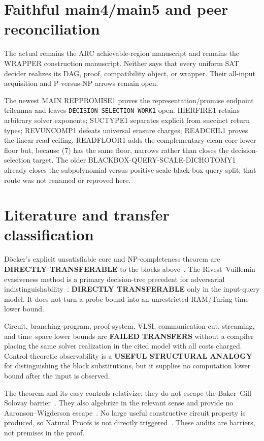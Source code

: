 \documentclass[11pt]{article}
\begin{document}
\section{Faithful main4/main5 and peer reconciliation}
The actual  remains the ARC achievable-region manuscript and
 remains the WRAPPER construction manuscript.  Neither says
that every uniform SAT decider realizes its DAG, proof, compatibility object,
or wrapper.  Their all-input acquisition and P-versus-NP arrows remain open.

The newest MAIN REPPROMISE1 proves the representation/promise endpoint
trilemma and leaves \texttt{DECISION-SELECTION-WORK1} open.  HIERFIRE1 retains
arbitrary solver exponents; SUCTYPE1 separates explicit from succinct return
types; REVUNCOMP1 defeats universal erasure charges; READCEIL1 proves the
linear read ceiling.  READFLOOR1 adds the complementary clean-core lower floor
but, because (7) has the same floor, narrows rather than closes the decision-
selection target.  The older BLACKBOX-QUERY-SCALE-DICHOTOMY1 already closes
the subpolynomial versus positive-scale black-box query split; that route was
not renamed or reproved here.

\section{Literature and transfer classification}
Döcker's explicit unsatisfiable core and NP-completeness theorem are
\textbf{DIRECTLY TRANSFERABLE} to the blocks above~\cite{Doecker19}.  The
Rivest--Vuillemin evasiveness method is a primary decision-tree precedent for
adversarial indistinguishability~\cite{RV76}: \textbf{DIRECTLY TRANSFERABLE}
only in the input-query model.  It does not turn a probe bound into an
unrestricted RAM/Turing time lower bound.

Circuit, branching-program, proof-system, VLSI, communication-cut, streaming,
and time--space lower bounds are \textbf{FAILED TRANSFERS} without a compiler
placing the same solver realization in the cited model with all costs charged.
Control-theoretic observability is a \textbf{USEFUL STRUCTURAL ANALOGY} for
distinguishing the block substitutions, but it supplies no computation lower
bound after the input is observed.

The theorem and its easy controls relativize; they do not escape the
Baker--Gill--Solovay barrier~\cite{BGS75}.  They also algebrize in the relevant
sense and provide no Aaronson--Wigderson escape~\cite{AW09}.  No large useful
constructive circuit property is produced, so Natural Proofs is not directly
triggered~\cite{RR97}.  These audits are barriers, not premises in the proof.
\end{document}
